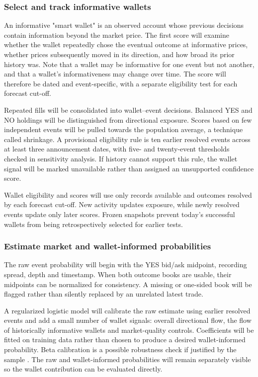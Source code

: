 \subsubsection{Select and track informative wallets}
An informative "smart wallet" is an observed account whose previous decisions contain information beyond the market price. The first score will examine whether the wallet repeatedly chose the eventual outcome at informative prices, whether prices subsequently moved in its direction, and how broad its prior history was. Note that a wallet may be informative for one event but not another, and that a wallet's informativeness may change over time. The score will therefore be dated and event-specific, with a separate eligibility test for each forecast cut-off.

Repeated fills will be consolidated into wallet--event decisions. Balanced YES and NO holdings will be distinguished from directional exposure. Scores based on few independent events will be pulled towards the population average, a technique called shrinkage. A provisional eligibility rule is ten earlier resolved events across at least three announcement dates, with five- and twenty-event thresholds checked in sensitivity analysis. If history cannot support this rule, the wallet signal will be marked unavailable rather than assigned an unsupported confidence score.

Wallet eligibility and scores will use only records available and outcomes resolved by each forecast cut-off. New activity updates exposure, while newly resolved events update only later scores. Frozen snapshots prevent today's successful wallets from being retrospectively selected for earlier tests.

\subsubsection{Estimate market and wallet-informed probabilities}
The raw event probability will begin with the YES bid/ask midpoint, recording spread, depth and timestamp. When both outcome books are usable, their midpoints can be normalized for consistency. A missing or one-sided book will be flagged rather than silently replaced by an unrelated latest trade.

A regularized logistic model will calibrate the raw estimate using earlier resolved events and add a small number of wallet signals: overall directional flow, the flow of historically informative wallets and market-quality controls. Coefficients will be fitted on training data rather than chosen to produce a desired wallet-informed probability. Beta calibration is a possible robustness check if justified by the sample \cite{kull}. The raw and wallet-informed probabilities will remain separately visible so the wallet contribution can be evaluated directly.

